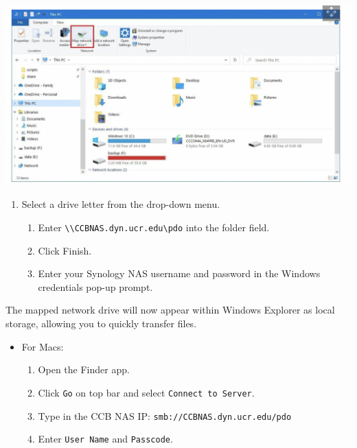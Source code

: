 \documentclass[
]{book}
\providecommand{\tightlist}{%
  \setlength{\itemsep}{0pt}\setlength{\parskip}{0pt}}
\begin{document}
\begin{flushleft}\includegraphics{images/nas_map10} \end{flushleft}

\begin{enumerate}
\def\labelenumi{\arabic{enumi}.}
\setcounter{enumi}{3}
\tightlist
\item
  Select a drive letter from the drop-down menu.

  \begin{enumerate}
  \def\labelenumii{\arabic{enumii}.}
  \setcounter{enumii}{4}
  \tightlist
  \item
    Enter \texttt{\textbackslash{}\textbackslash{}CCBNAS.dyn.ucr.edu\textbackslash{}pdo} into the folder field.
  \item
    Click Finish.
  \item
    Enter your Synology NAS username and password in the Windows credentials pop-up prompt.
  \end{enumerate}
\end{enumerate}

The mapped network drive will now appear within Windows Explorer as local storage, allowing you to quickly transfer files.

\begin{itemize}
\tightlist
\item
  For Macs:

  \begin{enumerate}
  \def\labelenumi{\arabic{enumi}.}
  \tightlist
  \item
    Open the Finder app.
  \item
    Click \texttt{Go} on top bar and select \texttt{Connect\ to\ Server}.
  \item
    Type in the CCB NAS IP: \texttt{smb://CCBNAS.dyn.ucr.edu/pdo}
  \item
    Enter \texttt{User\ Name} and \texttt{Passcode}.
  \end{enumerate}
\end{itemize}
\end{document}
